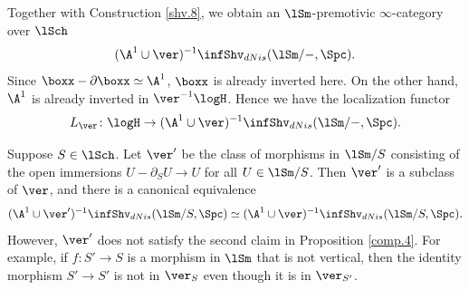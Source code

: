 \documentclass[10pt]{amsart}
\begin{document}
Together with Construction \ref{shv.8}, we obtain an $\lSm$-premotivic $\infty$-category over $\lSch$
\[
(\A^1\cup \ver)^{-1}\infShv_{dNis}(\lSm/-,\Spc).
\]
Since $\boxx-\partial \boxx\simeq \A^1$, $\boxx$ is already inverted here.
On the other hand, $\A^1$ is already inverted in $\ver^{-1}\logH$.
Hence we have the localization functor
\begin{equation}
L_{\ver}
\colon
\logH \to (\A^1\cup \ver)^{-1}\infShv_{dNis}(\lSm/-,\Spc).
\end{equation}

\begin{rmk}
Suppose $S\in \lSch$.
Let $\ver'$ be the class of morphisms in $\lSm/S$ consisting of the open immersions $U-\partial_S U\to U$ for all $U\in \lSm/S$.
Then $\ver'$ is a subclass of $\ver$, and there is a canonical equivalence
\[
(\A^1\cup \ver')^{-1}\infShv_{dNis}(\lSm/S,\Spc)
\simeq
(\A^1\cup \ver)^{-1}\infShv_{dNis}(\lSm/S,\Spc).
\]
However, $\ver'$ does not satisfy the second claim in Proposition \ref{comp.4}.
For example, if $f\colon S'\to S$ is a morphism in $\lSm$ that is not vertical, then the identity morphism $S'\to S'$ is not in $\ver_{S}$ even though it is in $\ver_{S'}$.
\end{rmk}
\end{document}
